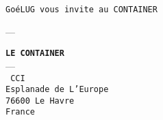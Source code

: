 \begin{slide}


\begin{center}
\texttt{GoéLUG vous invite au CONTAINER}

---

\texttt{\textbf{LE CONTAINER}} \\
--- \\
\texttt{
CCI \\
Esplanade de L'Europe \\
76600 Le Havre \\
France
}
\end{center}

\end{slide}